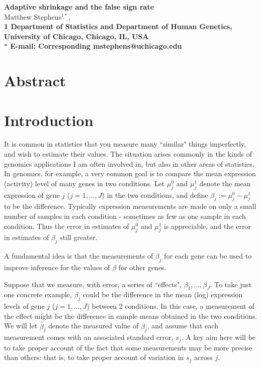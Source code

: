 \documentclass[11pt]{article}
\date{}
\begin{document}
\begin{flushleft}
{\Large
\textbf{Adaptive shrinkage and the false sign rate}
}
\\
Matthew Stephens$^{1*}$, 
\\
\bf{1} Department of Statistics and Department of Human Genetics, University of Chicago, Chicago, IL, USA
\\
$\ast$ E-mail: Corresponding mstephens@uchicago.edu
\end{flushleft}

\section*{Abstract}


\section*{Introduction}

It is common in statistics that you measure many ``similar" things imperfectly, and wish to estimate their values. The situation arises commonly in the kinds of genomics applications I am often involved in, but also in other areas of statistics.
In genomics, for example, a very common goal
is to compare the mean
expression (activity) level of many genes in two conditions.
Let $\mu^0_j$ and $\mu^1_j$ denote the mean expression 
of gene $j$ ($j=1,\dots,J$) in the two conditions, and define $\beta_j:= \mu^0_j - \mu^1_j$ to be the difference. Typically expression
measurements are made on only a small number of
samples in each condition - sometimes as few as one
sample in each condition. Thus the error in estimates
of $\mu^0_j$ and $\mu^1_j$ is appreciable, and the error
in estimates of $\beta_j$ still greater.

A fundamental idea is
that the measurements of $\beta_j$ for each gene can be used to improve inference for the values of $\beta$ for other genes.

Suppose that we measure, with error, a series of ``effects", $\beta_1,\dots,\beta_J$. To take just one concrete 
example, $\beta_j$ could be 
the difference in the mean (log) expression levels of gene $j$ ($j=1,\dots,J$) between 2 conditions. In this case, a measurement of
the effect might be the difference in sample means obtained in the two conditions. We will let $\hat\beta_j$ denote the measured value of $\beta_j$, and assume that
each measurement comes with an associated standard error, 
$s_j$. A key aim here will be to take proper account of the fact that some measurements may be more precise than others: that is, to take proper account of variation in $s_j$ across $j$.
\end{document}
